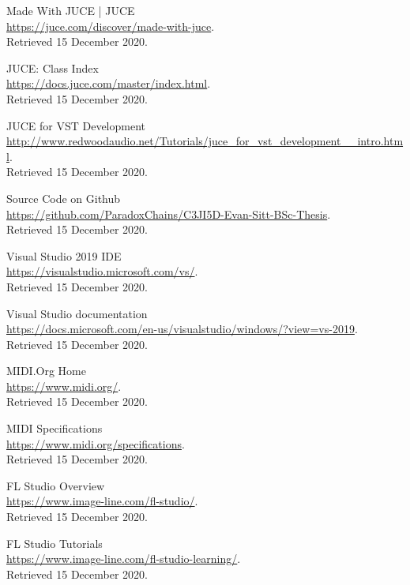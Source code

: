 \documentclass[a4paper,12pt]{report}
\begin{document}
\begin{thebibliography}{9}

Made With JUCE | JUCE\\
\url{https://juce.com/discover/made-with-juce}.\\
Retrieved 15 December 2020.

JUCE: Class Index\\
\url{https://docs.juce.com/master/index.html}.\\
Retrieved 15 December 2020.

JUCE for VST Development\\
\url{http://www.redwoodaudio.net/Tutorials/juce_for_vst_development__intro.html}.\\
Retrieved 15 December 2020.

Source Code on Github\\
\url{https://github.com/ParadoxChains/C3JI5D-Evan-Sitt-BSc-Thesis}.\\
Retrieved 15 December 2020.

Visual Studio 2019 IDE\\
\url{https://visualstudio.microsoft.com/vs/}.\\
Retrieved 15 December 2020.

Visual Studio documentation\\
\url{https://docs.microsoft.com/en-us/visualstudio/windows/?view=vs-2019}.\\
Retrieved 15 December 2020.

MIDI.Org Home\\
\url{https://www.midi.org/}.\\
Retrieved 15 December 2020.

MIDI Specifications\\
\url{https://www.midi.org/specifications}.\\
Retrieved 15 December 2020.

FL Studio Overview\\
\url{https://www.image-line.com/fl-studio/}.\\
Retrieved 15 December 2020.

FL Studio Tutorials\\
\url{https://www.image-line.com/fl-studio-learning/}.\\
Retrieved 15 December 2020.


\end{thebibliography}
\end{document}
